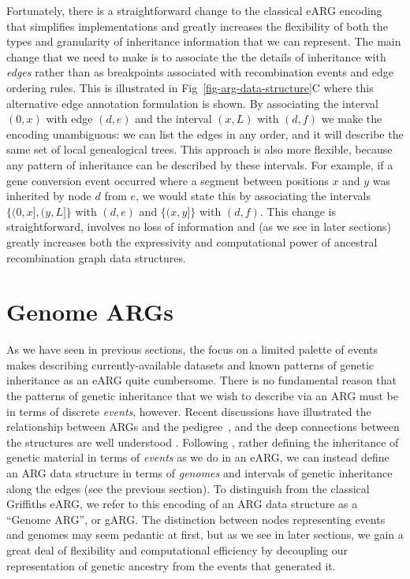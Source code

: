 \documentclass{article}
\begin{document}
Fortunately, there is a straightforward change to the
classical eARG encoding that simplifies
implementations and greatly increases the flexibility
of both the types and granularity of inheritance information
that we can represent.
The main change that we need to make is to
associate the
the details of inheritance with \emph{edges} rather than
as breakpoints associated with recombination events and
edge ordering rules.
This is illustrated in Fig~\ref{fig-arg-data-structure}C
where this alternative edge annotation formulation is
shown. By associating the interval $(0, x)$ with edge $(d,e)$
and the interval $(x, L)$ with $(d, f)$ we make the encoding
unambiguous: we can list the edges in any order, and it
will describe the same set of local genealogical trees.
This approach is also more flexible, because any pattern
of inheritance can be described by these intervals. For
example, if a gene conversion event occurred where a segment
between positions $x$ and $y$ was inherited by
node $d$ from $e$, we would state this by associating
the intervals $\{(0, x], (y, L]\}$ with $(d,e)$ and
$\{(x, y]\}$ with $(d,f)$.
This change is straightforward, involves no loss of information
and (as we see in later sections)
greatly increases both the expressivity and computational
power of ancestral recombination graph data structures.

\section*{Genome ARGs}
As we have seen in previous sections, the focus
on a limited palette of events makes describing currently-available
datasets and known patterns of genetic inheritance as an eARG
quite cumbersome.
There is no fundamental reason that the patterns of genetic inheritance
that we wish to describe via an ARG must be in terms
of discrete \emph{events}, however. Recent discussions have illustrated the
relationship between ARGs and
the pedigree~\citep{mathieson2020ancestry,brandt2021evaluation},
and the deep connections between the structures are
well understood
\citep[e.g.][]{wakeley2012genetics,gusfield2014recombinatorics,
speed2015naturereviewsgenetics}.
Following \cite{mathieson2020ancestry},
rather defining the inheritance
of genetic material in terms of \emph{events} as we do in an eARG,
we can instead define an ARG data structure in terms of
\emph{genomes} and intervals of genetic inheritance
along the edges (see the previous section).
To distinguish from the classical Griffiths eARG,
we refer to this encoding of an ARG data structure
as a ``Genome ARG'', or gARG.
The distinction between nodes representing events
and genomes may seem pedantic at first, but as we
see in later sections, we gain a great deal of flexibility
and computational efficiency by decoupling our representation
of genetic ancestry from the events that generated it.
\end{document}
